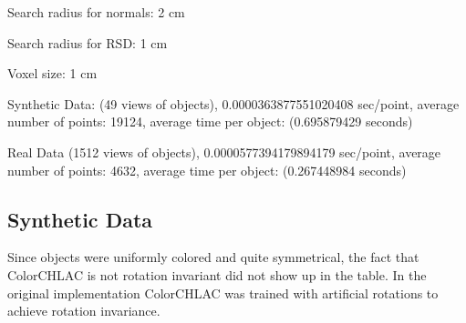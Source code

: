 \documentclass[conference]{sty/IEEEtran}
\begin{document}
Search radius for normals: 2 cm

Search radius for RSD: 1 cm

Voxel size: 1 cm

Synthetic Data: (49 views of objects), 0.0000363877551020408 sec/point, average number of points: 19124, average time per object: (0.695879429 seconds)

Real Data (1512 views of objects), 0.0000577394179894179  sec/point,  average number of points: 4632, average time per object: (0.267448984 seconds)

\subsection{Synthetic Data}


 Since objects were uniformly colored and quite symmetrical, the fact that ColorCHLAC is not rotation invariant did not show up in the table.
In the original implementation ColorCHLAC was trained with artificial rotations to achieve rotation invariance.
\end{document}
